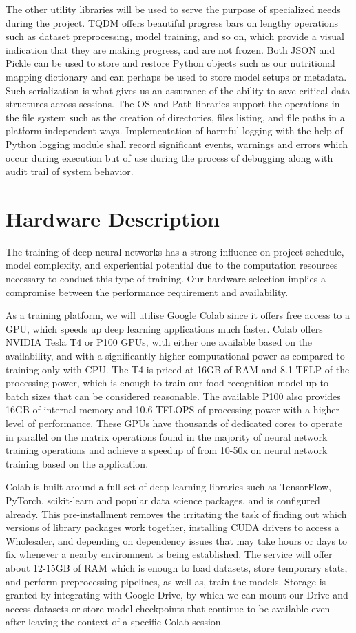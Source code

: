 \documentclass[12pt, openany]{report}
\begin{document}
The other utility libraries will be used to serve the purpose of specialized needs during the project. TQDM offers beautiful progress bars on lengthy operations such as dataset preprocessing, model training, and so on, which provide a visual indication that they are making progress, and are not frozen. Both JSON and Pickle can be used to store and restore Python objects such as our nutritional mapping dictionary and can perhaps be used to store model setups or metadata. Such serialization is what gives us an assurance of the ability to save critical data structures across sessions. The OS and Path libraries support the operations in the file system such as the creation of directories, files listing, and file paths in a platform independent ways. Implementation of harmful logging with the help of Python logging module shall record significant events, warnings and errors which occur during execution but of use during the process of debugging along with audit trail of system behavior.

\section{Hardware Description}
The training of deep neural networks has a strong influence on project schedule, model complexity, and experiential potential due to the computation resources necessary to conduct this type of training. Our hardware selection implies a compromise between the performance requirement and availability.

As a training platform, we will utilise Google Colab since it offers free access to a GPU, which speeds up deep learning applications much faster. Colab offers NVIDIA Tesla T4 or P100 GPUs, with either one available based on the availability, and with a significantly higher computational power as compared to training only with CPU. The T4 is priced at 16GB of RAM and 8.1 TFLP of the processing power, which is enough to train our food recognition model up to batch sizes that can be considered reasonable. The available P100 also provides 16GB of internal memory and 10.6 TFLOPS of processing power with a higher level of performance. These GPUs have thousands of dedicated cores to operate in parallel on the matrix operations found in the majority of neural network training operations and achieve a speedup of from 10-50x on neural network training based on the application.

Colab is built around a full set of deep learning libraries such as TensorFlow, PyTorch, scikit-learn and popular data science packages, and is configured already. This pre-installment removes the irritating the task of finding out which versions of library packages work together, installing CUDA drivers to access a Wholesaler, and depending on dependency issues that may take hours or days to fix whenever a nearby environment is being established. The service will offer about 12-15GB of RAM which is enough to load datasets, store temporary stats, and perform preprocessing pipelines, as well as, train the models. Storage is granted by integrating with Google Drive, by which we can mount our Drive and access datasets or store model checkpoints that continue to be available even after leaving the context of a specific Colab session.
\end{document}
